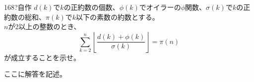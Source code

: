 \begin{prob}{168}{\hosi ?}{自作}
 $d(k)$で$k$の正約数の個数、$\phi(k)$でオイラーの$\phi$関数、$\sigma(k)$で$k$の正約数の総和、$\pi(k)$で$k$以下の素数の約数とする。 \\
 $n$が2以上の整数のとき、
 \[ \sum_{k=2}^n \left\lfloor \frac{d(k)+\phi(k)}{\sigma(k)} \right\rfloor = \pi(n) \]
 が成立することを示せ。
\end{prob}
ここに解答を記述。
